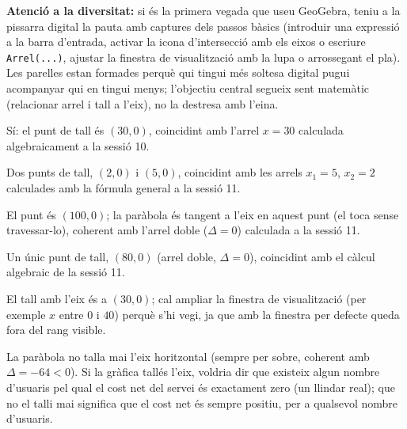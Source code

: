 \noindent\textbf{Atenció a la diversitat:} si és la primera vegada que useu
GeoGebra, teniu a la pissarra digital la pauta amb captures dels passos
bàsics (introduir una expressió a la barra d'entrada, activar la icona
d'intersecció amb els eixos o escriure \texttt{Arrel(...)}, ajustar la
finestra de visualització amb la lupa o arrossegant el pla). Les parelles
estan formades perquè qui tingui més soltesa digital pugui acompanyar qui
en tingui menys; l'objectiu central segueix sent matemàtic (relacionar
arrel i tall a l'eix), no la destresa amb l'eina.

\begin{solucions}
\begin{sollist}
  \item Sí: el punt de tall és $(30, 0)$, coincidint amb l'arrel $x=30$
        calculada algebraicament a la sessió 10.
  \item Dos punts de tall, $(2, 0)$ i $(5, 0)$, coincidint amb les arrels
        $x_1=5$, $x_2=2$ calculades amb la fórmula general a la sessió 11.
  \item El punt és $(100, 0)$; la paràbola és tangent a l'eix en aquest
        punt (el toca sense travessar-lo), coherent amb l'arrel doble
        ($\Delta=0$) calculada a la sessió 11.
  \item Un únic punt de tall, $(80, 0)$ (arrel doble, $\Delta=0$),
        coincidint amb el càlcul algebraic de la sessió 11.
  \item El tall amb l'eix és a $(30, 0)$; cal ampliar la finestra de
        visualització (per exemple $x$ entre $0$ i $40$) perquè s'hi
        vegi, ja que amb la finestra per defecte queda fora del rang
        visible.
  \item La paràbola no talla mai l'eix horitzontal (sempre per sobre,
        coherent amb $\Delta=-64<0$). Si la gràfica tallés l'eix,
        voldria dir que existeix algun nombre d'usuaris pel qual el
        cost net del servei és exactament zero (un llindar real); que
        no el talli mai significa que el cost net és sempre positiu,
        per a qualsevol nombre d'usuaris.
\end{sollist}
\end{solucions}
